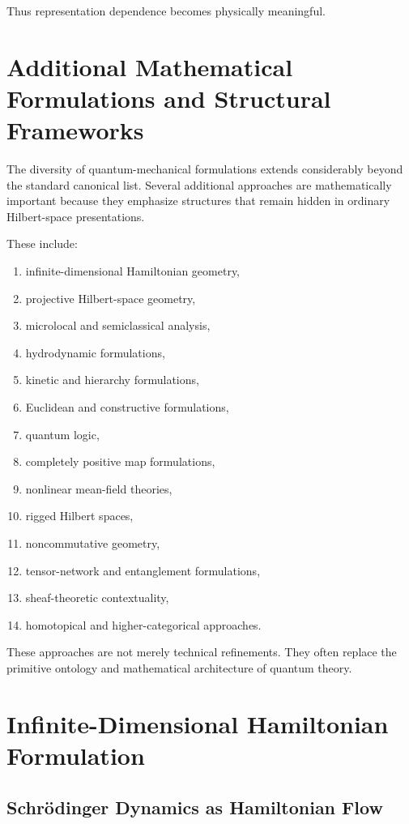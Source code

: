 \documentclass[11pt]{article}
\begin{document}
Thus representation dependence becomes physically meaningful.

\section{Additional Mathematical Formulations and Structural Frameworks}

The diversity of quantum-mechanical formulations extends considerably beyond the standard canonical list. 
Several additional approaches are mathematically important because they emphasize structures that remain hidden in ordinary Hilbert-space presentations.

These include:

\begin{enumerate}
\item infinite-dimensional Hamiltonian geometry,
\item projective Hilbert-space geometry,
\item microlocal and semiclassical analysis,
\item hydrodynamic formulations,
\item kinetic and hierarchy formulations,
\item Euclidean and constructive formulations,
\item quantum logic,
\item completely positive map formulations,
\item nonlinear mean-field theories,
\item rigged Hilbert spaces,
\item noncommutative geometry,
\item tensor-network and entanglement formulations,
\item sheaf-theoretic contextuality,
\item homotopical and higher-categorical approaches.
\end{enumerate}

These approaches are not merely technical refinements. 
They often replace the primitive ontology and mathematical architecture of quantum theory.

\section{Infinite-Dimensional Hamiltonian Formulation}

\subsection{Schr\"odinger Dynamics as Hamiltonian Flow}
\end{document}
